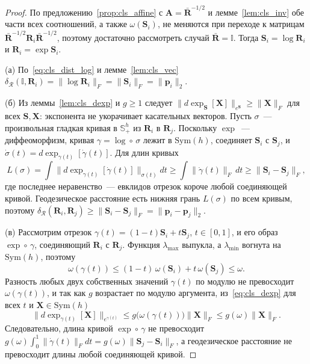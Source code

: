 \begin{proof}
По предложению~\ref{prop:cls_affine} с $\mathbf{A} = \bar{\mathbf{R}}^{-1/2}$ и лемме~\ref{lem:cls_inv} обе части всех соотношений, а также $\omega(\mathbf{S}_i)$, не меняются при переходе к матрицам $\bar{\mathbf{R}}^{-1/2}\mathbf{R}_i\bar{\mathbf{R}}^{-1/2}$, поэтому достаточно рассмотреть случай $\bar{\mathbf{R}} = \mathbb{I}$. Тогда $\mathbf{S}_i = \log \mathbf{R}_i$ и $\mathbf{R}_i = \exp \mathbf{S}_i$.

(а) По~\eqref{eq:cls_dist_log} и лемме~\ref{lem:cls_vec} $\delta_{\mathcal{R}}(\mathbb{I}, \mathbf{R}_i) = \|\log \mathbf{R}_i\|_F = \|\mathbf{S}_i\|_F = \|\mathbf{p}_i\|_2$.

(б) Из леммы~\ref{lem:cls_dexp} и $g \geqslant 1$ следует $\|d\exp_{\mathbf{S}}[\mathbf{X}]\|_{e^{\mathbf{S}}} \geqslant \|\mathbf{X}\|_F$ для всех $\mathbf{S}, \mathbf{X}$: экспонента не укорачивает касательных векторов. Пусть $\sigma$~--- произвольная гладкая кривая в $\mathbb{S}_{+}^{h}$ из $\mathbf{R}_i$ в $\mathbf{R}_j$. Поскольку $\exp$~--- диффеоморфизм, кривая $\gamma = \log \circ\, \sigma$ лежит в $\mathrm{Sym}(h)$, соединяет $\mathbf{S}_i$ с $\mathbf{S}_j$, и $\dot{\sigma}(t) = d\exp_{\gamma(t)}[\dot{\gamma}(t)]$. Для длин кривых
\begin{equation*}
L(\sigma) = \int \big\| d\exp_{\gamma(t)}[\dot{\gamma}(t)] \big\|_{\sigma(t)} dt \geqslant \int \|\dot{\gamma}(t)\|_F \, dt \geqslant \|\mathbf{S}_i - \mathbf{S}_j\|_F ,
\end{equation*}
где последнее неравенство~--- евклидов отрезок короче любой соединяющей кривой. Геодезическое расстояние есть нижняя грань $L(\sigma)$ по всем кривым, поэтому $\delta_{\mathcal{R}}(\mathbf{R}_i, \mathbf{R}_j) \geqslant \|\mathbf{S}_i - \mathbf{S}_j\|_F = \|\mathbf{p}_i - \mathbf{p}_j\|_2$.

(в) Рассмотрим отрезок $\gamma(t) = (1-t)\mathbf{S}_i + t\mathbf{S}_j$, $t \in [0,1]$, и его образ $\exp \circ\, \gamma$, соединяющий $\mathbf{R}_i$ с $\mathbf{R}_j$. Функция $\lambda_{\max}$ выпукла, а $\lambda_{\min}$ вогнута на $\mathrm{Sym}(h)$, поэтому
\begin{equation*}
\omega(\gamma(t)) \leqslant (1-t)\,\omega(\mathbf{S}_i) + t\,\omega(\mathbf{S}_j) \leqslant \omega .
\end{equation*}
Разность любых двух собственных значений $\gamma(t)$ по модулю не превосходит $\omega(\gamma(t))$, и так как $g$ возрастает по модулю аргумента, из~\eqref{eq:cls_dexp} для всех $t$ и $\mathbf{X} \in \mathrm{Sym}(h)$
\begin{equation*}
\big\| d\exp_{\gamma(t)}[\mathbf{X}] \big\|_{e^{\gamma(t)}} \leqslant g\big(\omega(\gamma(t))\big) \|\mathbf{X}\|_F \leqslant g(\omega) \|\mathbf{X}\|_F .
\end{equation*}
Следовательно, длина кривой $\exp \circ\, \gamma$ не превосходит $g(\omega) \int_0^1 \|\dot{\gamma}(t)\|_F dt = g(\omega) \|\mathbf{S}_j - \mathbf{S}_i\|_F$, а геодезическое расстояние не превосходит длины любой соединяющей кривой.


\end{proof}
